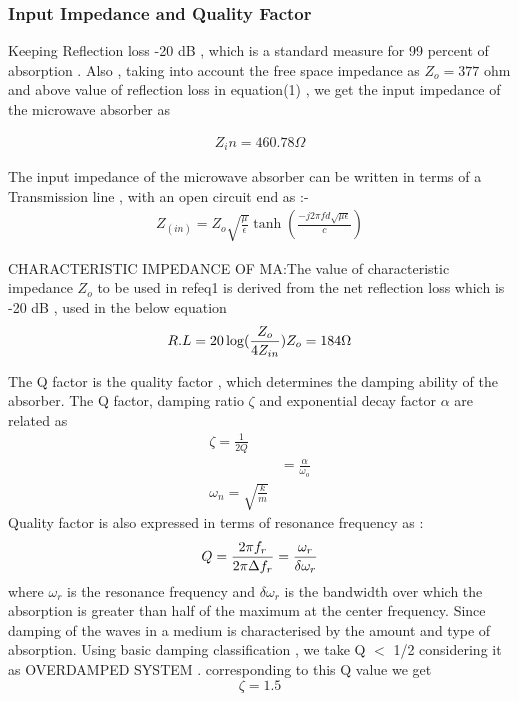 \documentclass[journal]{IEEEtran}
\begin{document}
\subsubsection{Input Impedance and Quality Factor}
Keeping Reflection loss -20 dB , which is a standard measure for 99 percent  of absorption .
Also , taking into account the free space impedance as $ Z_o = 377  $ ohm and above value of  reflection loss in equation(1) , we get the input impedance of the microwave absorber as 

\begin{align}
Z_in = 460.78 \Omega  \label{v1}
\end{align} 

 The input impedance of the microwave absorber can be written in terms of a Transmission line , with an open circuit end as \cite{YingL2}:-
 \begin{align}
 Z_(in) = Z_o \sqrt{\frac{\mu }{\epsilon}} \tanh(\frac{-j2 \pi f d \sqrt{ \mu \epsilon}}{c}) \label{eq2}
 \end{align}
 
CHARACTERISTIC IMPEDANCE OF MA:The value of characteristic impedance $Z_o $ to be used in 
ref{eq1} is derived from the net reflection loss which is -20 dB , used in the below equation \cite{Shukla}
\begin{equation}
R.L = 20 \log(\frac{Z_o}{4Z_{in}}) \label{eq3} \\
Z_o = 184 \Omega  \\
\end{equation}

The Q factor is the quality factor , which determines the damping ability of the absorber\cite{YingL2}. The Q factor, damping ratio $\zeta$ and exponential decay factor $\alpha$ are related as \cite{r5}
\begin{align}
\zeta = \frac{1}{2Q} \\
 &= \frac{\alpha}{\omega_o} \label{two}\\
 \omega_n = \sqrt{\frac{k}{m}} \label{three}
\end{align}
Quality factor is also expressed in terms of resonance frequency as \cite{r2}:
$$   Q = \dfrac{2 \pi f_r}{2 \pi \Delta f_r} \label{four} \\
           = \dfrac{\omega_r}{\delta \omega_r}
$$ where $ \omega_r$ is the resonance frequency and $\delta \omega_r$ is the bandwidth over which the absorption is greater than half of the maximum at the center frequency.
Since damping of the waves in a medium is characterised by the amount and type of absorption. Using basic damping classification , we take Q $<$ 1/2 considering it as OVERDAMPED SYSTEM \cite{r6} . corresponding to this Q value we get $$\zeta = 1.5 $$
\end{document}
